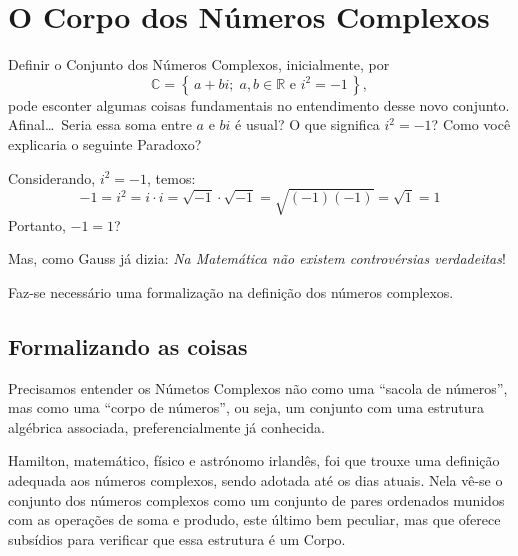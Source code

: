 
\section{O Corpo dos Números Complexos}
\label{sec:corpo}

Definir o Conjunto dos Números Complexos, inicialmente, por 
\[
  \mathbb{C} = \left\{\, a + bi; \; a,b \in \mathbb{R} \text{ e } i^2 = -1 \,\right\},
\]
pode esconter algumas coisas fundamentais no entendimento desse novo conjunto. 
Afinal\ldots\ 
Seria essa soma entre $a$ e $bi$ é usual?
O que significa $i^2 = -1$?
Como você explicaria o seguinte Paradoxo?

\begin{paradoxo}
  Considerando, $ i^2 = -1$, temos:
  \[
    -1 = i^2 = i \cdot i = \sqrt{-1}\cdot \sqrt{-1} = \sqrt{(-1)(-1)} = \sqrt{1} = 1
  \]
Portanto, $-1 = 1$?
\end{paradoxo}

Mas, como Gauss já dizia: \textit{Na Matemática não existem controvérsias verdadeitas}! 

Faz-se necessário uma formalização na definição dos números complexos. 

\subsection{Formalizando as coisas} %

Precisamos entender os Númetos Complexos não como uma ``sacola de números'', mas 
como uma ``corpo de números'', ou seja, um conjunto com uma estrutura algébrica 
associada, preferencialmente já conhecida.

Hamilton, matemático, físico e astrónomo irlandês, foi que trouxe uma definição 
adequada aos números complexos, sendo adotada até os dias atuais. 
Nela vê-se o conjunto dos números complexos como um conjunto de pares ordenados 
munidos com as operações de soma e produdo, este último bem peculiar, mas que 
oferece subsídios para verificar que essa estrutura é um Corpo. 


